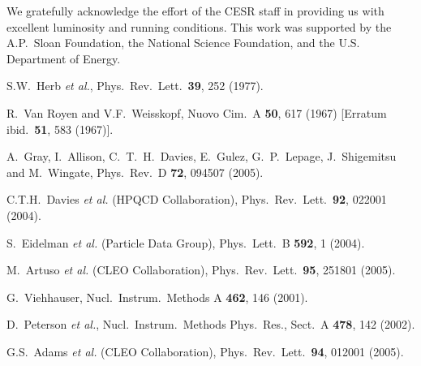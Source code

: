 \documentclass[aps,prl,twocolumn,superscriptaddress,showpacs,floatfix]{revtex4}
\begin{document}
We gratefully acknowledge the effort of the CESR staff 
in providing us with excellent luminosity and running conditions.
This work was supported by 
the A.P.~Sloan Foundation,
the National Science Foundation,
and the U.S. Department of Energy.

\begin{thebibliography}{99}

S.W.~Herb {\it et al.},
Phys.\ Rev.\ Lett.\  {\bf 39}, 252 (1977).

R.~Van Royen and V.F.~Weisskopf,
Nuovo Cim.\ A {\bf 50}, 617 (1967)
[Erratum ibid.\ {\bf 51}, 583 (1967)].

A.~Gray, I.~Allison, C.~T.~H.~Davies, E.~Gulez, G.~P.~Lepage, J.~Shigemitsu and M.~Wingate,
Phys.\ Rev.\ D {\bf 72}, 094507 (2005).

C.T.H.~Davies {\it et al.}  (HPQCD Collaboration),
Phys.\ Rev.\ Lett.\  {\bf 92}, 022001 (2004).

S.~Eidelman {\it et al.}  (Particle Data Group),
Phys.\ Lett.\ B {\bf 592}, 1 (2004).

M.~Artuso {\it et al.}  (CLEO Collaboration),
Phys.\ Rev.\ Lett.\ {\bf 95}, 251801 (2005).

G.~Viehhauser, Nucl.\ Instrum.\ Methods A {\bf 462}, 146 (2001).

D.~Peterson {\it et al.}, Nucl.\ Instrum.\ Methods Phys.\ Res., Sect.\ A {\bf 478}, 142 (2002).

G.S.~Adams {\it et al.}  (CLEO Collaboration),
Phys.\ Rev.\ Lett.\  {\bf 94}, 012001 (2005).


\end{thebibliography}
\end{document}
